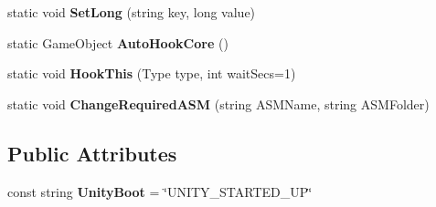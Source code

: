 \begin{DoxyCompactItemize}
static void {\bfseries Set\+Long} (string key, long value)
\item 
\mbox{\label{class_lerp2_a_p_i_1_1_lerped_core_a08686dd819d1bf6f193fd0d19e9aaf44}} 
static Game\+Object {\bfseries Auto\+Hook\+Core} ()
\item 
\mbox{\label{class_lerp2_a_p_i_1_1_lerped_core_af512946193066845c4eedb9aee4c5a24}} 
static void {\bfseries Hook\+This} (Type type, int wait\+Secs=1)
\item 
\mbox{\label{class_lerp2_a_p_i_1_1_lerped_core_aafa1793eca75685416f09ab96e2daebc}} 
static void {\bfseries Change\+Required\+A\+SM} (string A\+S\+M\+Name, string A\+S\+M\+Folder)
\end{DoxyCompactItemize}
\subsection*{Public Attributes}
\begin{DoxyCompactItemize}
\item 
\mbox{\label{class_lerp2_a_p_i_1_1_lerped_core_a627d9992398d79b222731f131d2f40c0}} 
const string {\bfseries Unity\+Boot} = \char`\"{}U\+N\+I\+T\+Y\+\_\+\+S\+T\+A\+R\+T\+E\+D\+\_\+\+UP\char`\"{}
\end{DoxyCompactItemize}
